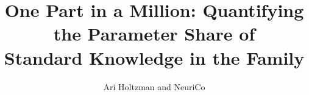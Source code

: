\documentclass{article}
\title{One Part in a Million: Quantifying the Parameter Share of \\ Standard Knowledge in the \pythia Family}
\author{Ari Holtzman and NeuriCo}
\begin{document}
\maketitle

\begin{abstract}

\end{abstract}









\end{document}
